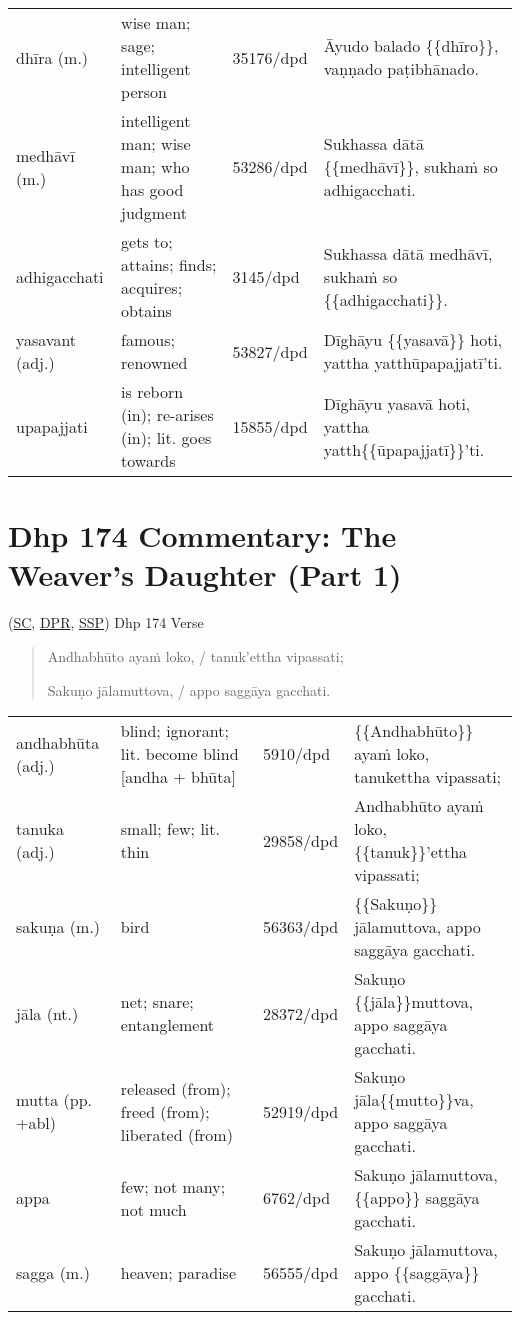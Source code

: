 \documentclass[11pt,oneside]{memoir}
\begin{document}
\begin{longtable}{L{\colOne} L{\colTwo} H H}
dhīra (m.) & wise man; sage; intelligent person & 35176/dpd & Āyudo balado \{\{dhīro\}\}, vaṇṇado paṭibhānado.\\[0pt]
medhāvī (m.) & intelligent man; wise man; who has good judgment & 53286/dpd & Sukhassa dātā \{\{medhāvī\}\}, sukhaṁ so adhigacchati.\\[0pt]
adhigacchati & gets to; attains; finds; acquires; obtains & 3145/dpd & Sukhassa dātā medhāvī, sukhaṁ so \{\{adhigacchati\}\}.\\[0pt]
yasavant (adj.) & famous; renowned & 53827/dpd & Dīghāyu \{\{yasavā\}\} hoti, yattha yatthūpapajjatī'ti.\\[0pt]
upapajjati & is reborn (in); re-arises (in); lit. goes towards & 15855/dpd & Dīghāyu yasavā hoti, yattha yatth\{\{ūpapajjatī\}\}'ti.\\[0pt]
\end{longtable}

\section{Dhp 174 Commentary: The Weaver's Daughter (Part 1)}
\label{sec:orgf9581a2}

(\href{https://suttacentral.net/dhp167-178/pli/ms}{SC}, \href{https://www.digitalpalireader.online/\_dprhtml/index.html?loc=k.1.0.0.12.0.0.m}{DPR}, \href{http://localhost:4848/suttas/dhp167-178/pli/ms?quote=Andhabh\%25C5\%25ABto\%2520aya\%25E1\%25B9\%2581\%2520loko\&window\_type=Sutta+Study}{SSP}) Dhp 174 Verse

\begin{quote}
Andhabhūto ayaṁ loko, / tanuk'ettha vipassati;

Sakuṇo jālamuttova, / appo saggāya gacchati.
\end{quote}

\begin{longtable}{L{\colOne} L{\colTwo} H H}
andhabhūta (adj.) & blind; ignorant; lit. become blind [andha + bhūta] & 5910/dpd & \{\{Andhabhūto\}\} ayaṁ loko, tanukettha vipassati;\\[0pt]
tanuka (adj.) & small; few; lit. thin & 29858/dpd & Andhabhūto ayaṁ loko, \{\{tanuk\}\}'ettha vipassati;\\[0pt]
sakuṇa (m.) & bird & 56363/dpd & \{\{Sakuṇo\}\} jālamuttova, appo saggāya gacchati.\\[0pt]
jāla (nt.) & net; snare; entanglement & 28372/dpd & Sakuṇo \{\{jāla\}\}muttova, appo saggāya gacchati.\\[0pt]
mutta (pp. +abl) & released (from); freed (from); liberated (from) & 52919/dpd & Sakuṇo jāla\{\{mutto\}\}va, appo saggāya gacchati.\\[0pt]
appa & few; not many; not much & 6762/dpd & Sakuṇo jālamuttova, \{\{appo\}\} saggāya gacchati.\\[0pt]
sagga (m.) & heaven; paradise & 56555/dpd & Sakuṇo jālamuttova, appo \{\{saggāya\}\} gacchati.\\[0pt]
\end{longtable}
\end{document}
